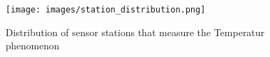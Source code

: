 

\begin{figure}[H]
	\centering
	\texttt{[image: images/station\_distribution.png]}
	\caption{Distribution of sensor stations that measure the \ldq{}Temperatur\rdq{} phenomenon}
	\label{fig:station_dsitribution}
\end{figure}
